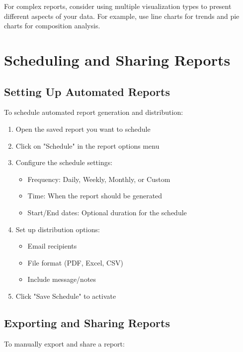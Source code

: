 \documentclass[12pt,a4paper]{report}
\newenvironment{tip}
  {\begin{tcolorbox}[colback=tuliplightgray,colframe=tulipgreen,title=Tip]}
  {\end{tcolorbox}}
\begin{document}
\begin{tip}
For complex reports, consider using multiple visualization types to present different aspects of your data. For example, use line charts for trends and pie charts for composition analysis.
\end{tip}

\section{Scheduling and Sharing Reports}

\subsection{Setting Up Automated Reports}

To schedule automated report generation and distribution:

\begin{enumerate}
    \item Open the saved report you want to schedule
    \item Click on "Schedule" in the report options menu
    \item Configure the schedule settings:
    \begin{itemize}
        \item Frequency: Daily, Weekly, Monthly, or Custom
        \item Time: When the report should be generated
        \item Start/End dates: Optional duration for the schedule
    \end{itemize}
    \item Set up distribution options:
    \begin{itemize}
        \item Email recipients
        \item File format (PDF, Excel, CSV)
        \item Include message/notes
    \end{itemize}
    \item Click "Save Schedule" to activate
\end{enumerate}

\subsection{Exporting and Sharing Reports}

To manually export and share a report:
\end{document}
